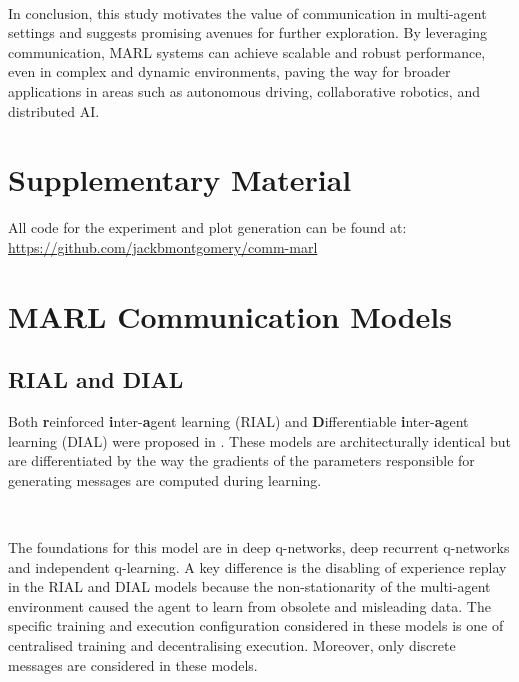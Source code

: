 \documentclass{article}
\begin{document}
\

In conclusion, this study motivates the value of communication in multi-agent settings and suggests promising avenues for further exploration. By leveraging communication, MARL systems can achieve scalable and robust performance, even in complex and dynamic environments, paving the way for broader applications in areas such as autonomous driving, collaborative robotics, and distributed AI.

\newpage



\newpage

\appendix

\section{Supplementary Material}
All code for the experiment and plot generation can be found at: \url{https://github.com/jackbmontgomery/comm-marl}


\section{MARL Communication Models} \label{sec:models}
\subsection{RIAL and DIAL}\label{subsec:dial_rial}

Both \textbf{r}einforced \textbf{i}nter-\textbf{a}gent learning (RIAL) and \textbf{D}ifferentiable \textbf{i}nter-\textbf{a}gent learning (DIAL) were proposed in \citet{foerster2016learning}. These models are architecturally identical but are differentiated by the way the gradients of the parameters responsible for generating messages are computed during learning.

\

The foundations for this model are in deep q-networks, deep recurrent q-networks and independent q-learning. A key difference is the disabling of experience replay in the RIAL and DIAL models because the non-stationarity of the multi-agent environment caused the agent to learn from obsolete and misleading data. The specific training and execution configuration considered in these models is one of centralised training and decentralising execution. Moreover, only discrete messages are considered in these models. 
\end{document}
